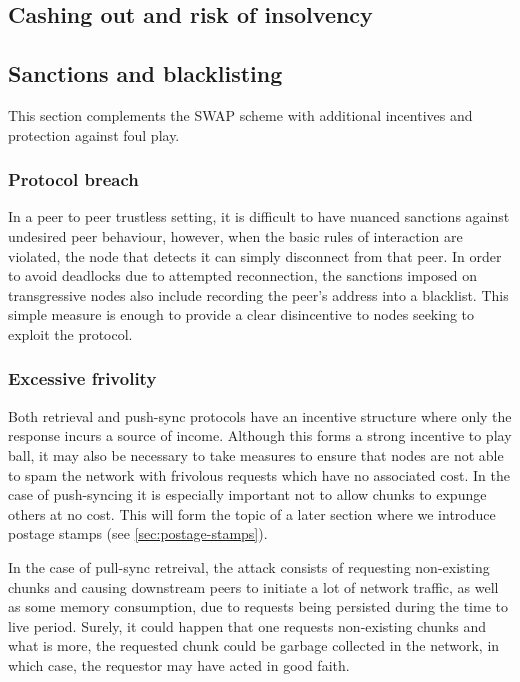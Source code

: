 \subsection{Cashing out and risk of insolvency}



\subsection{Sanctions and blacklisting \statusgreen}\label{sec:sanctions}
\red{}

This section complements the SWAP scheme with additional incentives and protection against foul play. 

\subsubsection{Protocol breach}

In a peer to peer trustless setting, it is difficult to have nuanced sanctions against undesired peer behaviour, however, when the basic rules of interaction are violated, the node that detects it can simply disconnect from that peer. In order to avoid deadlocks due to attempted reconnection, the sanctions imposed on transgressive nodes also include recording the peer's address into a blacklist. This simple measure is enough to provide a clear disincentive to nodes seeking to exploit the protocol. 

\subsubsection{Excessive frivolity}

Both retrieval and push-sync protocols have an incentive structure where only the response incurs a source of income. Although this forms a strong incentive to play ball, it may also be necessary to take measures to ensure that nodes are not able to spam the network with frivolous requests which have no associated cost. In the case of push-syncing it is especially important not to allow chunks to expunge others at no cost. This will form the topic of a later section where we introduce postage stamps (see \ref{sec:postage-stamps}).

In the case of pull-sync retreival, the attack consists of requesting non-existing chunks and causing downstream peers to initiate a lot of network traffic, as well as some memory consumption, due to requests being persisted during the time to live period.
Surely, it could happen that one requests non-existing chunks and what is more, the requested chunk could be garbage collected in the network, in which case, the requestor may have acted in good faith. 

